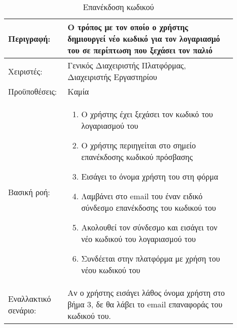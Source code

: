 \begin{table}[h]
	\caption{Επανέκδοση κωδικού}
	\label{tab:use-case-forgot-password}
	\begin{tabular}{|p{0.2\linewidth}|p{0.7\linewidth}|}
		\hline
		Περιγραφή: & Ο τρόπος με τον οποίο ο χρήστης δημιουργεί νέο κωδικό για τον λογαριασμό του σε περίπτωση που ξεχάσει τον παλιό \\ \hline
		Χειριστές: & Γενικός Διαχειριστής Πλατφόρμας, Διαχειριστής Εργαστηρίου \\ \hline
		Προϋποθέσεις: & Καμία \\ \hline
		Βασική ροή: & 
		\begin{enumerate}
			\item Ο χρήστης έχει ξεχάσει τον κωδικό του λογαριασμού του
			\item Ο χρήστης περιηγείται στο σημείο επανέκδοσης κωδικού πρόσβασης
			\item Εισάγει το όνομα χρήστη του στη φόρμα
			\item Λαμβάνει στο email του έναν ειδικό σύνδεσμο επανέκδοσης του κωδικού του
			\item Ακολουθεί τον σύνδεσμο και εισάγει τον νέο κωδικού του λογαριασμού του
			\item Συνδέεται στην πλατφόρμα με χρήση του νέου κωδικού του
		\end{enumerate} \\ \hline
		Εναλλακτικό σενάριο: & Αν ο χρήστης εισάγει λάθος όνομα χρήστη στο βήμα 3, δε θα λάβει το email επαναφοράς του κωδικού του. \\ \hline
	\end{tabular}
\end{table}

